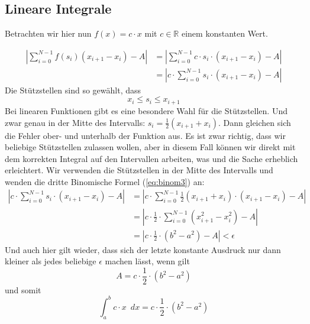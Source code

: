 \subsection{Lineare Integrale}

Betrachten wir hier nun $f(x) = c\cdot x$ mit $c\in \mathbb{R}$ einem konstanten Wert. 

\begin{equation}
\begin{split}
\left| \sum_{i=0}^{N-1} f(s_i)(x_{i+1}-x_i) -A \right| &= \left| \sum_{i=0}^{N-1} c\cdot s_i \cdot (x_{i+1}-x_i) -A \right| \\ 
&=\left|  c\cdot \sum_{i=0}^{N-1}s_i \cdot (x_{i+1}-x_i) -A \right|
\end{split}
\end{equation}
Die Stützstellen sind so gewählt, dass
\begin{equation}
x_i \le s_i \le x_{i+1}
\end{equation}
Bei linearen Funktionen gibt es eine besondere Wahl für die Stützstellen. Und zwar genau in der Mitte des Intervalls: $s_i = \frac{1}{2}(x_{i+1}+x_i)$. Dann gleichen sich die Fehler ober- und unterhalb der Funktion aus. Es ist zwar richtig, dass wir beliebige Stützstellen zulassen wollen, aber in diesem Fall können wir direkt mit dem korrekten Integral auf den Intervallen arbeiten, was und die Sache erheblich erleichtert. Wir verwenden die Stützstellen in der Mitte des Intervalls und wenden die dritte Binomische Formel (\ref{eq:binom3}) an:
\begin{equation}
\begin{split}
\left|  c\cdot \sum_{i=0}^{N-1}s_i \cdot (x_{i+1}-x_i) -A \right| &= \left|  c\cdot \sum_{i=0}^{N-1} \frac{1}{2}(x_{i+1}+x_i) \cdot (x_{i+1}-x_i) -A \right|\\
&=\left|  c\cdot \frac{1}{2} \cdot \sum_{i=0}^{N-1} (x_{i+1}^2-x_i^2) -A \right|\\
&=\left|  c\cdot \frac{1}{2} \cdot (b^2-a^2) -A \right| < \epsilon
\end{split}
\end{equation}
Und auch hier gilt wieder, dass sich der letzte konstante Ausdruck nur dann kleiner als jedes beliebige $\epsilon$ machen lässt, wenn gilt
\begin{equation}
A = c\cdot \frac{1}{2} \cdot (b^2-a^2)
\end{equation}
und somit
\begin{equation}
\int_a^b c\cdot x \enspace dx = c\cdot \frac{1}{2} \cdot (b^2-a^2)
\end{equation}


